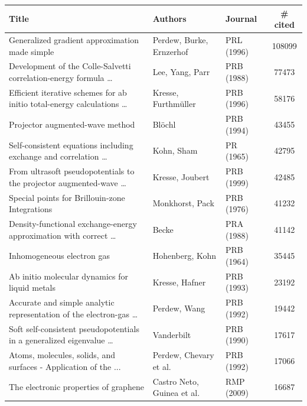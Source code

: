 \documentclass[9pt,review]{livecoms}
\newcommand{\red}[1]{{\color[HTML]{FE0000} #1}}
\begin{document}
\begin{table}
    \centering

\begin{tabular}{lllS[table-format=5.0]}
    \toprule
    Title                                                                 & Authors                    & Journal    & {\# cited} \\ \midrule
\red{Generalized gradient approximation made simple} & Perdew, Burke, Ernzerhof   & PRL (1996) & 108099  \\
\red{Development of the Colle-Salvetti correlation-energy formula … }       & Lee, Yang, Parr            & PRB (1988) & 77473   \\
\red{Efficient iterative schemes for ab initio total-energy calculations …} & Kresse, Furthmüller        & PRB (1996) & 58176   \\
\red{Projector augmented-wave method                                      } & Blöchl                     & PRB (1994) & 43455   \\
\red{Self-consistent equations including exchange and correlation …       } & Kohn, Sham                 & PR (1965)  & 42795   \\
\red{From ultrasoft pseudopotentials to the projector augmented-wave …    } & Kresse, Joubert            & PRB (1999) & 42485   \\
\red{Special points for Brillouin-zone Integrations                       } & Monkhorst, Pack            & PRB (1976) & 41232   \\
\red{Density-functional exchange-energy approximation with correct …      } & Becke                      & PRA (1988) & 41142   \\
\red{Inhomogeneous electron gas                                           } & Hohenberg, Kohn            & PRB (1964) & 35445   \\
\red{Ab initio molecular dynamics for liquid metals                       } & Kresse, Hafner             & PRB (1993) & 23192   \\
\red{Accurate and simple analytic representation of the electron-gas …    } & Perdew, Wang               & PRB (1992) & 19442   \\
\red{Soft self-consistent pseudopotentials in a generalized eigenvalue …  } & Vanderbilt                 & PRB (1990) & 17617   \\
\red{Atoms, molecules, solids, and surfaces - Application of the ...      } & Perdew, Chevary et al.     & PRB (1992) & 17066   \\
{The electronic properties of graphene                                } & Castro Neto, Guinea et al. & RMP (2009) & 16687   \\

\end{tabular}
\end{table}
\end{document}
